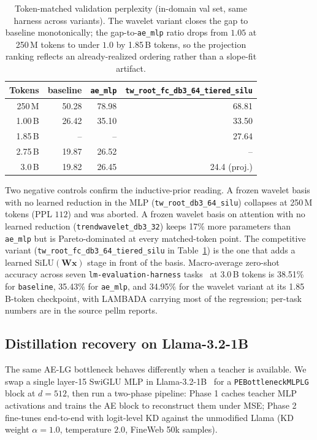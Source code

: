 \documentclass[11pt,a4paper]{article}
\begin{document}
\begin{table}[h]
  \caption{Token-matched validation perplexity (in-domain val set, same harness across variants). The wavelet variant closes the gap to baseline monotonically; the gap-to-\texttt{ae\_mlp} ratio drops from $1.05$ at 250\,M tokens to under $1.0$ by 1.85\,B tokens, so the projection ranking reflects an already-realized ordering rather than a slope-fit artifact.}
  \label{tab:llm_trajectory}
  \centering
  \begin{tabular}{rrrr}
    \toprule
    Tokens & baseline & \texttt{ae\_mlp} & \texttt{tw\_root\_fc\_db3\_64\_tiered\_silu} \\
    \midrule
    250\,M  & 50.28 & 78.98 & 68.81 \\
    1.00\,B & 26.42 & 35.10 & 33.50 \\
    1.85\,B & --    & --    & 27.64 \\
    2.75\,B & 19.87 & 26.52 & -- \\
    3.0\,B  & 19.82 & 26.45 & 24.4 (proj.) \\
    \bottomrule
  \end{tabular}
\end{table}

Two negative controls confirm the inductive-prior reading. A frozen wavelet basis with no learned reduction in the MLP (\texttt{tw\_root\_db3\_64\_silu}) collapses at 250\,M tokens (PPL $112$) and was aborted. A frozen wavelet basis on attention with no learned reduction (\texttt{trendwavelet\_db3\_32}) keeps 17\% more parameters than \texttt{ae\_mlp} but is Pareto-dominated at every matched-token point. The competitive variant (\texttt{tw\_root\_fc\_db3\_64\_tiered\_silu} in Table~\ref{tab:llm_trajectory}) is the one that adds a learned $\mathrm{SiLU}(\mathbf{W}\mathbf{x})$ stage in front of the basis. Macro-average zero-shot accuracy across seven \texttt{lm-evaluation-harness} tasks~\citep{eval-harness} at 3.0\,B tokens is 38.51\% for \texttt{baseline}, 35.43\% for \texttt{ae\_mlp}, and 34.95\% for the wavelet variant at its 1.85\,B-token checkpoint, with LAMBADA carrying most of the regression; per-task numbers are in the source pellm reports.

\subsection{Distillation recovery on Llama-3.2-1B}

The same AE-LG bottleneck behaves differently when a teacher is available. We swap a single layer-15 SwiGLU MLP in Llama-3.2-1B~\citep{llama32} for a \texttt{PEBottleneckMLPLG} block at $d=512$, then run a two-phase pipeline: Phase 1 caches teacher MLP activations and trains the AE block to reconstruct them under MSE; Phase 2 fine-tunes end-to-end with logit-level KD against the unmodified Llama (KD weight $\alpha=1.0$, temperature $2.0$, FineWeb 50k samples).
\end{document}
